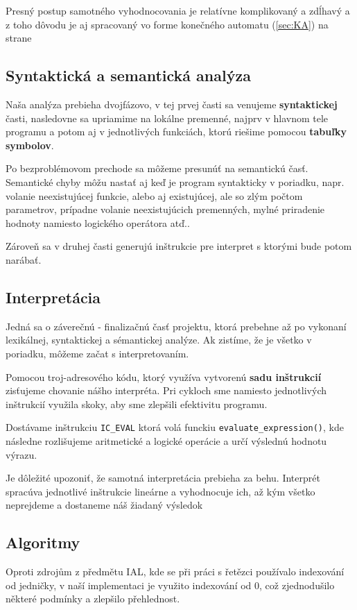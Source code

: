 \documentclass[12pt, a4paper]{article}
\begin{document}
        Presný postup samotného vyhodnocovania je relatívne komplikovaný a zdĺhavý a z toho dôvodu je aj spracovaný vo forme konečného automatu (\ref{sec:KA}) na strane \pageref{sec:KA}

        \subsection{Syntaktická a semantická analýza}
        Naša analýza prebieha dvojfázovo, v tej prvej časti sa venujeme \textbf{syntaktickej} časti, nasledovne sa upriamime na lokálne premenné, najprv v hlavnom tele programu a potom aj v jednotlivých funkciách, ktorú riešime pomocou \textbf{tabuľky symbolov}.

        Po bezproblémovom prechode sa môžeme presunúť na semantickú časť. Semantické chyby môžu nastať aj keď je program syntakticky v poriadku, napr. volanie neexistujúcej funkcie, alebo aj existujúcej, ale so zlým počtom parametrov, prípadne volanie neexistujúcich premenných, mylné priradenie hodnoty namiesto logického operátora atď..

        Zároveň sa v druhej časti generujú inštrukcie pre interpret s ktorými bude potom narábať.
        \subsection{Interpretácia}
        Jedná sa o záverečnú - finalizačnú časť projektu, ktorá prebehne až po vykonaní lexikálnej, syntaktickej a sémantickej analýze. Ak zistíme, že je všetko v poriadku, môžeme začat s interpretovaním.

        Pomocou troj-adresového kódu, ktorý využíva  vytvorenú \textbf{sadu inštrukcií} zisťujeme chovanie nášho interpréta. Pri cykloch sme namiesto jednotlivých inštrukcií využila skoky, aby sme zlepšili efektivitu programu.

        Dostávame inštrukciu \verb|IC_EVAL| ktorá volá funckiu \verb|evaluate_expression()|, kde následne rozlišujeme aritmetické a logické operácie a určí výslednú hodnotu výrazu.

        Je dôležité upozoniť, že samotná interpretácia prebieha za behu. Interprét spracúva jednotlivé inštrukcie lineárne a vyhodnocuje ich, až kým všetko neprejdeme a dostaneme náš žiadaný výsledok

        \subsection{Algoritmy}
        Oproti zdrojům z předmětu IAL, kde se při práci s řetězci používalo indexování od jedničky, v naší implementaci je využito indexování od 0, což zjednodušilo některé podmínky a zlepšilo přehlednost.
\end{document}
